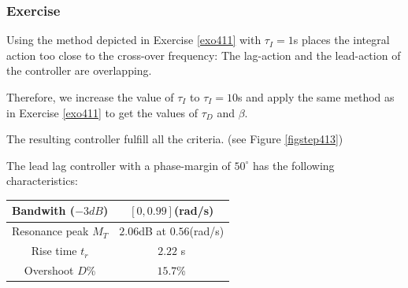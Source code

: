 \subsubsection{Exercise}

Using the method depicted in Exercise \ref{exo411} with $\tau_I = 1$s places the integral action too close to the cross-over frequency: The lag-action and the lead-action of the controller are overlapping.

Therefore, we increase the value of $\tau_I$ to $\tau_I = 10$s and apply the same method as in Exercise \ref{exo411} to get the values of $\tau_D$ and $\beta$.

The resulting controller fulfill all the criteria.
(see Figure \ref{figstep413})

The lead lag controller with a phase-margin of $50^{\circ}$ has the following characteristics:
\begin{center}
\begin{tabular}{|c|c|}
    \hline
    Bandwith ($-3dB$) & $[0,0.99]$(rad/s)\\
    \hline
    Resonance peak $M_T$ & $2.06$dB at $0.56$(rad/s)\\
    \hline
    Rise time $t_r$ & $2.22$ s\\
    \hline
    Overshoot $D$\% & $15.7$\%\\
    \hline
\end{tabular}
\end{center}

